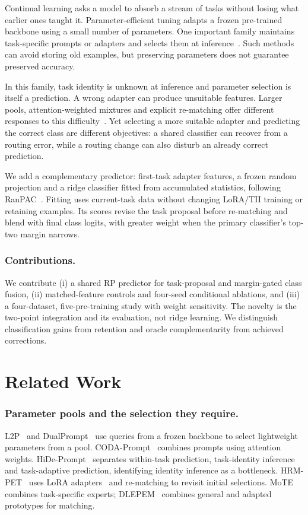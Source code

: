 \documentclass[runningheads]{llncs}
\begin{document}
Continual learning asks a model to absorb a stream of tasks without losing what
earlier ones taught it. Parameter-efficient tuning adapts a frozen pre-trained
backbone using a small number of parameters. One important family maintains
task-specific prompts or adapters and selects them at
inference~\cite{ref_dualprompt,ref_hide}. Such methods can avoid storing old
examples, but preserving parameters does not guarantee preserved accuracy.

In this family, task identity is unknown at inference and parameter selection
is itself a prediction. A wrong adapter can produce unsuitable features.
Larger pools, attention-weighted mixtures and explicit re-matching offer
different responses to this difficulty~\cite{ref_l2p,ref_coda,ref_hrmpet}.
Yet selecting a more suitable adapter and predicting the correct class are
different objectives: a shared classifier can recover from a routing error,
while a routing change can also disturb an already correct prediction.

We add a complementary predictor: first-task adapter features, a frozen random
projection and a ridge classifier fitted from accumulated statistics, following
RanPAC~\cite{ref_ranpac}. Fitting uses current-task data without changing LoRA/TII
training or retaining examples. Its scores revise the task proposal before
re-matching and blend with final class logits, with greater weight when the
primary classifier's top-two margin narrows.

\subsubsection{Contributions.}
We contribute (i) a shared RP predictor for task-proposal and margin-gated class
fusion, (ii) matched-feature controls and four-seed conditional ablations, and
(iii) a four-dataset, five-pre-training study with weight sensitivity.
The novelty is the two-point integration and its evaluation, not ridge learning.
We distinguish classification gains from retention and oracle complementarity
from achieved corrections.

\section{Related Work}
\label{sec:related}

\subsubsection{Parameter pools and the selection they require.}
L2P~\cite{ref_l2p} and DualPrompt~\cite{ref_dualprompt} use queries from a frozen
backbone to select lightweight parameters from a pool.
CODA-Prompt~\cite{ref_coda} combines prompts using attention weights.
HiDe-Prompt~\cite{ref_hide} separates within-task prediction, task-identity
inference and task-adaptive prediction, identifying identity inference as a
bottleneck. HRM-PET~\cite{ref_hrmpet} uses LoRA adapters~\cite{ref_lora} and
re-matching to revisit initial selections. MoTE~\cite{ref_mote} combines
task-specific experts; DLEPEM~\cite{ref_dlepem} combines general and adapted
prototypes for matching.
\end{document}
